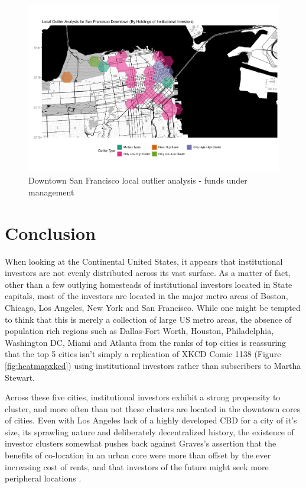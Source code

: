 \begin{figure}
	\centering
	\includegraphics[width=1\linewidth]{Figures/ChapterIV/SF_Money_LO_Downtown}
	\caption[Downtown San Francisco Local Outlier Analysis - Funds Under Management 2013-2018]{Downtown San Francisco local outlier analysis - funds under management}
	\label{fig:SFlocaloutlier_Downtown}
\end{figure}
\section{Conclusion}	


When looking at the Continental United States, it appears that institutional investors are not evenly distributed across its vast surface.  As a matter of fact, other than a few outlying homesteads of institutional investors located in State capitals, most of the investors are located in the major metro areas of Boston, Chicago, Los Angeles, New York and San Francisco.  While one might be tempted to think that this is merely a collection of large US metro areas, the absence of population rich regions such as Dallas-Fort Worth, Houston, Philadelphia, Washington DC, Miami and Atlanta from the ranks of top cities is reassuring that the top 5 cities isn't simply a replication of XKCD Comic 1138 (Figure \ref{fig:heatmapxkcd}) using institutional investors rather than subscribers to Martha Stewart. 

Across these five cities, institutional investors exhibit a strong propensity to cluster, and more often than not these clusters are located in the downtown cores of cities.  Even with Los Angeles lack of a highly developed CBD for a city of it's size, its sprawling nature and deliberately decentralized history, the  existence of investor clusters somewhat pushes back against Graves's assertion that the benefits of co-location in an urban core were more than offset by the ever increasing cost of rents, and that investors of the future might seek more peripheral locations \citep{Graves2003}.   

